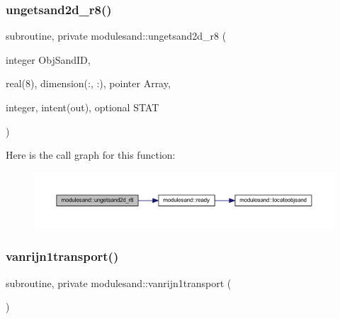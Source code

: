 \subsubsection{\texorpdfstring{ungetsand2d\+\_\+r8()}{ungetsand2d\_r8()}}
{\footnotesize\ttfamily subroutine, private modulesand\+::ungetsand2d\+\_\+r8 (\begin{DoxyParamCaption}\item[{integer}]{Obj\+Sand\+ID,  }\item[{real(8), dimension(\+:, \+:), pointer}]{Array,  }\item[{integer, intent(out), optional}]{S\+T\+AT }\end{DoxyParamCaption})\hspace{0.3cm}{\ttfamily [private]}}

Here is the call graph for this function\+:\nopagebreak
\begin{figure}[H]
\begin{center}
\leavevmode
\includegraphics[width=350pt]{namespacemodulesand_ab4572edb29539b65dc7c75cb29005448_cgraph}
\end{center}
\end{figure}
\mbox{\label{namespacemodulesand_abf8eba23882b69da0ba972e0af5b81ad}} 
\subsubsection{\texorpdfstring{vanrijn1transport()}{vanrijn1transport()}}
{\footnotesize\ttfamily subroutine, private modulesand\+::vanrijn1transport (\begin{DoxyParamCaption}{ }\end{DoxyParamCaption})\hspace{0.3cm}{\ttfamily [private]}}

